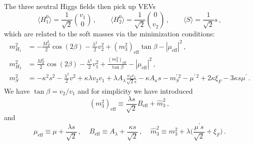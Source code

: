 \documentclass[final,3p,times,pdflatex]{elsarticle}
\newcommand{\be}{\begin{equation}}
\newcommand{\ee}{\end{equation}}
\newcommand{\ds}{\displaystyle}
\newcommand{\lamsq}{\lambda^2}
\begin{document}
\noindent The three neutral Higgs fields then pick up VEVs
%  
\be 
        \langle H_1^0 \rangle = \ds\frac{1}{\sqrt{2}}{v_1 \choose 0}\,, 
\qquad  \langle H_2^0 \rangle = \ds\frac{1}{\sqrt{2}}{0 \choose v_2}\,, 
\qquad  \langle S \rangle =  \ds\frac{1}{\sqrt{2}}s\,, \label{eq:potmin} 
\ee
%  
\noindent which are related to the soft masses via the minimization conditions:
%
\begin{align}
m_{H_1}^2&= -\frac{M_Z^2}{2}\cos(2\beta) - \ds\frac{\lamsq}{2} v_2^2
 + (m_3^2)_\textrm{eff} \tan\beta 
- |\mu_\textrm{eff}|^2\,, \label{eq:mind}\\
m_{H_2}^2&= \frac{M_Z^2}{2}\cos(2\beta) - \ds\frac{\lamsq}{2}v_1^2 
+  \frac{(m_3^2)_\textrm{eff}}{\tan\beta} 
- |\mu_\textrm{eff}|^2 \,, \label{eq:minu} \\
m_S^2 &= -\kappa^2 s^2 - \ds\frac{\lamsq}{2} 
v^2 + \kappa\lambda v_2v_1
+ \lambda A_{\lambda} \frac{v_2v_1}{\sqrt{2}s}
-\kappa A_{\kappa}s  - m^{\prime \,2}_S - \mu^{\prime \,2} + 2 \kappa \xi_F  - 3 \kappa s \mu^\prime \,.\label{eq:mins}
\end{align}
%
We have $\tan \beta = v_2 /  v_1$ and for simplicity we have introduced
\be (m_3^2)_\textrm{eff} \equiv
 \ds\frac{ \lambda s}{\sqrt{2}} B_\textrm{eff} + \widehat{m}_3^2\,, \ee and
\be  \mu_\textrm{eff} \equiv
 \mu + \frac{\lambda s}{\sqrt{2}}\,, \;\;\;\; B_\textrm{eff}\equiv A_\lambda+\ds\frac{\kappa s}{\sqrt{2}}\,, \;\;\;\; \widehat{m}_3^2 \equiv m_3^2 + \lambda \Bigg(\ds\frac{\mu^\prime s}{\sqrt{2}} + \xi_F\Bigg)\,. \ee


 
\end{document}
